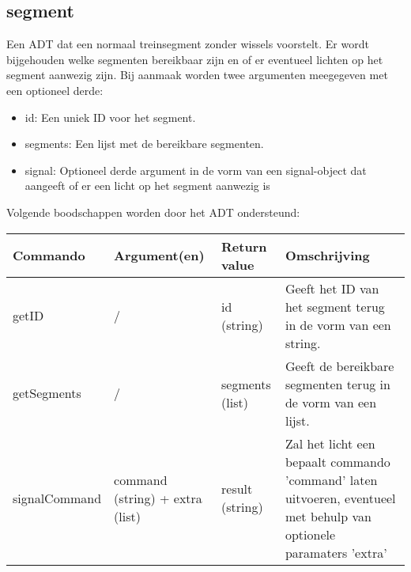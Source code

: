 \documentclass{article}
\begin{document}
\subsection{segment}
Een ADT dat een normaal treinsegment zonder wissels voorstelt. Er wordt bijgehouden welke segmenten bereikbaar zijn en of er eventueel lichten op het segment aanwezig zijn. Bij aanmaak worden twee argumenten meegegeven met een optioneel derde:
\begin{itemize}
  \item id: Een uniek ID voor het segment.
  \item segments: Een lijst met de bereikbare segmenten.
  \item signal: Optioneel derde argument in de vorm van een signal-object dat aangeeft of er een licht op het segment aanwezig is
\end{itemize}
Volgende boodschappen worden door het ADT ondersteund:
\begin{center}
    \begin{tabular}{ | l | l | l | p{6cm} |}
    \hline
    Commando & Argument(en) & Return value & Omschrijving \\ \hline
    getID & / & id (string) & Geeft het ID van het segment terug in de vorm van een string. \\ \hline
    getSegments & / & segments (list) & Geeft de bereikbare segmenten terug in de vorm van een lijst. \\ \hline
    signalCommand & command (string) + extra (list) & result (string) & Zal het licht een bepaalt commando 'command' laten uitvoeren, eventueel met behulp van optionele paramaters 'extra' \\ \hline
    \end{tabular}
\end{center}
\end{document}
